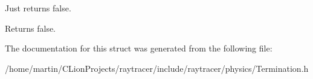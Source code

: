 Just returns false. 

\begin{DoxyReturn}{Returns}
false. 
\end{DoxyReturn}


The documentation for this struct was generated from the following file\+:\begin{DoxyCompactItemize}
\item 
/home/martin/\+C\+Lion\+Projects/raytracer/include/raytracer/physics/Termination.\+h\end{DoxyCompactItemize}
